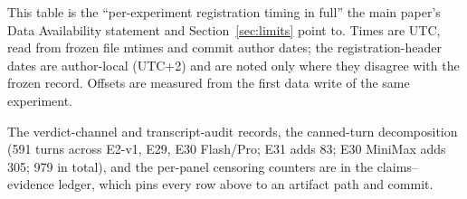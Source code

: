 This table is the ``per-experiment registration timing in full'' the main
paper's Data Availability statement and Section~\ref{sec:limits} point to.
Times are UTC, read from frozen file mtimes and commit author dates; the
registration-header dates are author-local (UTC+2) and are noted only where
they disagree with the frozen record. Offsets are measured from the first
data write of the same experiment.

\noindent The verdict-channel and transcript-audit records, the canned-turn
decomposition (591 turns across E2-v1, E29, E30 Flash/Pro; E31 adds 83;
E30 MiniMax adds 305; 979 in total), and the per-panel censoring counters are
in the claims--evidence ledger, which pins every row above to an artifact
path and commit.
